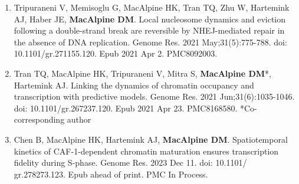 \begin{statement}
\begin{enumerate}
\item Tripuraneni V, Memisoglu G, MacAlpine HK, Tran TQ, Zhu W, Hartemink AJ, Haber JE, \textbf{MacAlpine DM}. Local nucleosome dynamics and eviction following a double-strand break are reversible by NHEJ-mediated repair in the absence of DNA replication. Genome Res. 2021 May;31(5):775-788. doi: 10.1101/gr.271155.120. Epub 2021 Apr 2. PMC8092003.

\item Tran TQ, MacAlpine HK, Tripuraneni V, Mitra S, \textbf{MacAlpine DM}*, Hartemink AJ. Linking the dynamics of chromatin occupancy and transcription with predictive models. Genome Res. 2021 Jun;31(6):1035-1046. doi: 10.1101/gr.267237.120. Epub 2021 Apr 23. PMC8168580. *Co-corresponding author


\item Chen B, MacAlpine HK, Hartemink AJ, \textbf{MacAlpine DM}. Spatiotemporal kinetics of CAF-1-dependent chromatin maturation ensures transcription fidelity during S-phase. Genome Res. 2023 Dec 11. doi: 10.1101/ gr.278273.123. Epub ahead of print. PMC In Process.

\end{enumerate}

\end{statement}
